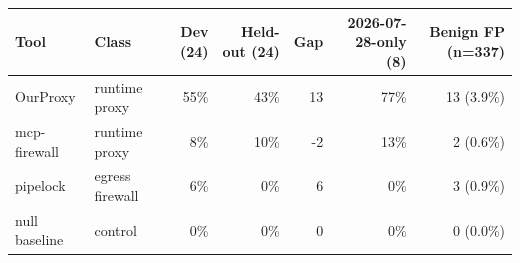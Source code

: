 \begin{tabular}{@{}llrrrrr@{}}
\toprule
Tool & Class & Dev (24) & Held-out (24) & Gap & 2026-07-28-only (8) & Benign FP (n=337) \\
\midrule
OurProxy & runtime proxy & 55\% & 43\% & 13 & 77\% & 13 (3.9\%) \\
mcp-firewall & runtime proxy & 8\% & 10\% & -2 & 13\% & 2 (0.6\%) \\
pipelock & egress firewall & 6\% & 0\% & 6 & 0\% & 3 (0.9\%) \\
null baseline & control & 0\% & 0\% & 0 & 0\% & 0 (0.0\%) \\
\bottomrule
\end{tabular}
